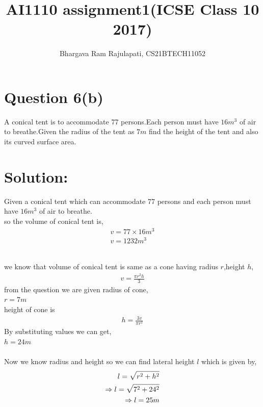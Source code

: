 \documentclass[article,12pt,twocolumn]{IEEEtran}
\title{AI1110 assignment1(ICSE Class 10 2017)}
\author{Bhargava Ram Rajulapati, CS21BTECH11052}
\begin{document}
  \maketitle
  \section*{Question 6(b)}
   A conical tent is to accommodate 77 persons.Each person must  
   have $16m^3$ of air to breathe.Given the radius of the tent as
   $7m$ find the height of the tent and also its curved surface
   area.\\
  \section*{Solution:}
  Given a conical tent which can accommodate 77 persons and each         
   person must have $16m^3$ of air to breathe.\\
  so the volume of conical tent is,
  \begin{align}
    v = 77 \times 16 m^3 \\
    v = 1232 m^3  
  \end{align}
   \begin{table}[ht!]
     \centering
   
    \caption{}
    \label{table:Table1}
  \end{table} \\
  we know that volume of conical tent is same as a cone having
  radius $r$,height $h$,
  \begin{align}
     v = \frac{\pi r^2 h}{3} 
  \end{align}
  from the question we are given radius of cone, \\
  $ r = 7 m $\\ 
  height of cone is
  \begin{align}
   h = \frac{3 v}{\pi r^2} 
  \end{align}
  By substituting values we can get, \\
  $ h = 24 m $ \\\\
  Now we know radius and height so we can find lateral height $l$
  which is given by,
  \begin{align}
    \hspace*{12pt} l = \sqrt{r^2 + h^2} \\
    \Rightarrow l = \sqrt{7^2 + 24^2} \\
    \Rightarrow l = 25 m
  \end{align} 
\end{document}
